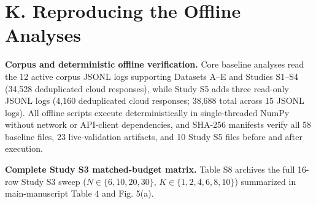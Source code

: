 \documentclass[10pt,letterpaper]{article}
\theoremstyle{definition}
\begin{document}
\section*{K. Reproducing the Offline Analyses}

\textbf{Corpus and deterministic offline verification.} Core baseline analyses read the 12 active corpus JSONL logs supporting Datasets A--E and Studies S1--S4 (34,528 deduplicated cloud responses), while Study S5 adds three read-only JSONL logs (4,160 deduplicated cloud responses; 38,688 total across 15 JSONL logs). All offline scripts execute deterministically in single-threaded NumPy without network or API-client dependencies, and SHA-256 manifests verify all 58 baseline files, 23 live-validation artifacts, and 10 Study S5 files before and after execution.


\textbf{Complete Study S3 matched-budget matrix.} Table S8 archives the full 16-row Study S3 sweep ($N \in \{6, 10, 20, 30\}$, $K \in \{1, 2, 4, 6, 8, 10\}$) summarized in main-manuscript Table 4 and Fig. 5(a).
\end{document}
